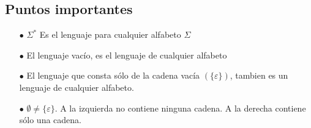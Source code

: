 \documentclass[letterpaper,12pt]{article}
\begin{document}
{\subsection*{Puntos importantes}

\begin{itemize}

    \item[$\bullet$] $\Sigma^{*}$ Es el lenguaje para cualquier alfabeto $\Sigma$
    
    \item[$\bullet$] El lenguaje vacío, es el lenguaje de cualquier alfabeto
    
    \item[$\bullet$] El lenguaje que consta sólo de la cadena vacía $(\{  \varepsilon \})$, tambien es un lenguaje de cualquier alfabeto. 
    
    \item[$\bullet$] $\emptyset \neq \{\varepsilon\}$. A la izquierda no contiene ninguna cadena. A la derecha contiene sólo una cadena.
    
\end{itemize}

} 
\end{document}

